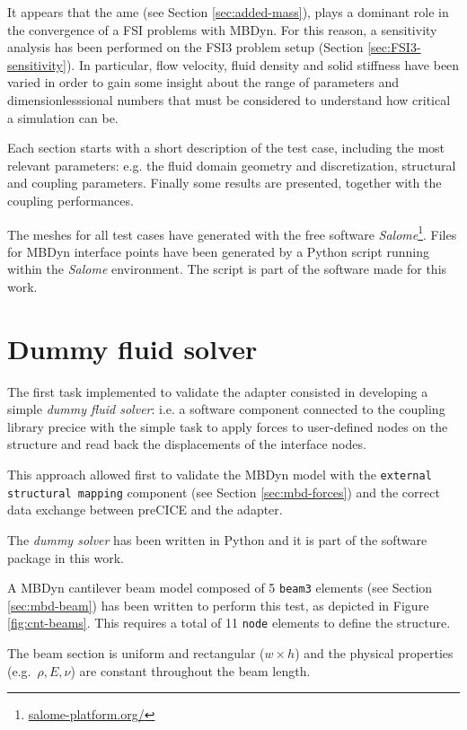 It appears that the \acrfull{ame} (see Section \ref{sec:added-mass}), plays a dominant role in the convergence of a FSI problems with MBDyn. For this reason, a sensitivity analysis has been performed on the FSI3 problem setup (Section \ref{sec:FSI3-sensitivity}). In particular, flow velocity, fluid density and solid stiffness have been varied in order to gain some insight about the range of parameters and dimensionlesssional numbers that must be considered to understand how critical a simulation can be.     

Each section starts with a short description of the test case, including the most relevant parameters: e.g. the fluid domain geometry and discretization, structural and coupling parameters. Finally some results are presented, together with the coupling performances.

The meshes for all test cases have generated with the free software \textit{Salome}\footnote{\href{https://www.salome-platform.org/}{salome-platform.org/}}. Files for MBDyn interface points have been generated by a Python script running within the \textit{Salome} environment. The script is part of the software made for this work. 


\section{Dummy fluid solver}
\label{sec:dummy}

The first task implemented to validate the adapter consisted in developing a simple \textit{dummy fluid solver}: i.e. a software component connected to the coupling library \acrshort{precice} with the simple task to apply forces to user-defined nodes on the structure and read back the displacements of the interface nodes.

This approach allowed first to validate the MBDyn model with the \texttt{external structural mapping} component (see Section \ref{sec:mbd-forces}) and the correct data exchange between preCICE and the adapter. 

The \textit{dummy solver} has been written in Python and it is part of the software package in this work.

A MBDyn cantilever beam model composed of 5 \texttt{beam3} elements (see Section \ref{sec:mbd-beam}) has been written to perform this test, as depicted in Figure \ref{fig:cnt-beams}. This requires a total of 11 \texttt{node} elements to define the structure.

The beam section is uniform and rectangular ($w \times h$) and the physical properties (e.g.~$\rho, E, \nu$) are constant throughout the beam length. 

